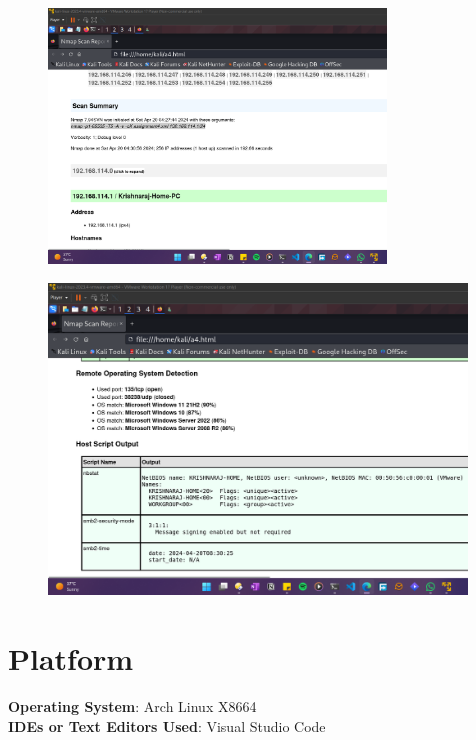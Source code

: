 \documentclass[11pt]{article}
\begin{document}
\begin{figure}[H]
    \centering
    \includegraphics[width=0.80\textwidth]{a4 (6).png}
\end{figure}

\begin{figure}[H]
    \centering
    \includegraphics[width=0.99\textwidth]{a4 (7).png}
\end{figure}

\section{Platform}
\textbf{Operating System}: Arch Linux X8664 \\
\textbf{IDEs or Text Editors Used}: Visual Studio Code\\
\end{document}
